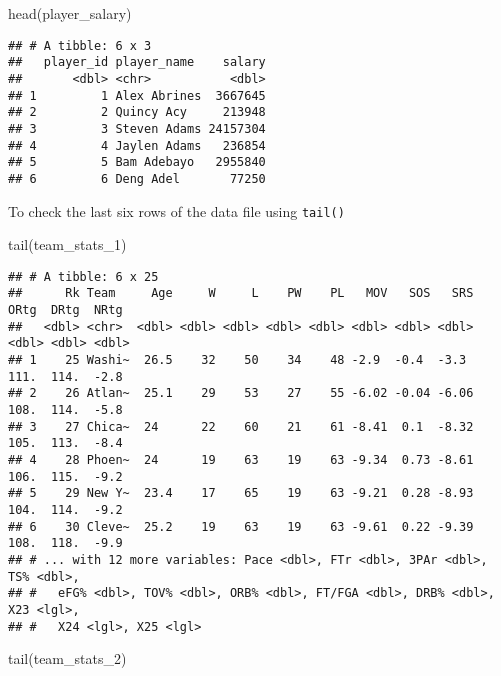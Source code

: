 \documentclass[
]{article}
\newenvironment{Shaded}{\begin{snugshade}}{\end{snugshade}}
\newcommand{\FunctionTok}[1]{\textcolor[rgb]{0.00,0.00,0.00}{#1}}
\newcommand{\NormalTok}[1]{#1}
\begin{document}
\begin{Shaded}
\begin{Highlighting}[]
\FunctionTok{head}\NormalTok{(player\_salary)}
\end{Highlighting}
\end{Shaded}

\begin{verbatim}
## # A tibble: 6 x 3
##   player_id player_name    salary
##       <dbl> <chr>           <dbl>
## 1         1 Alex Abrines  3667645
## 2         2 Quincy Acy     213948
## 3         3 Steven Adams 24157304
## 4         4 Jaylen Adams   236854
## 5         5 Bam Adebayo   2955840
## 6         6 Deng Adel       77250
\end{verbatim}

To check the last six rows of the data file using \texttt{tail()}

\begin{Shaded}
\begin{Highlighting}[]
\FunctionTok{tail}\NormalTok{(team\_stats\_1)}
\end{Highlighting}
\end{Shaded}

\begin{verbatim}
## # A tibble: 6 x 25
##      Rk Team     Age     W     L    PW    PL   MOV   SOS   SRS  ORtg  DRtg  NRtg
##   <dbl> <chr>  <dbl> <dbl> <dbl> <dbl> <dbl> <dbl> <dbl> <dbl> <dbl> <dbl> <dbl>
## 1    25 Washi~  26.5    32    50    34    48 -2.9  -0.4  -3.3   111.  114.  -2.8
## 2    26 Atlan~  25.1    29    53    27    55 -6.02 -0.04 -6.06  108.  114.  -5.8
## 3    27 Chica~  24      22    60    21    61 -8.41  0.1  -8.32  105.  113.  -8.4
## 4    28 Phoen~  24      19    63    19    63 -9.34  0.73 -8.61  106.  115.  -9.2
## 5    29 New Y~  23.4    17    65    19    63 -9.21  0.28 -8.93  104.  114.  -9.2
## 6    30 Cleve~  25.2    19    63    19    63 -9.61  0.22 -9.39  108.  118.  -9.9
## # ... with 12 more variables: Pace <dbl>, FTr <dbl>, 3PAr <dbl>, TS% <dbl>,
## #   eFG% <dbl>, TOV% <dbl>, ORB% <dbl>, FT/FGA <dbl>, DRB% <dbl>, X23 <lgl>,
## #   X24 <lgl>, X25 <lgl>
\end{verbatim}

\begin{Shaded}
\begin{Highlighting}[]
\FunctionTok{tail}\NormalTok{(team\_stats\_2)}
\end{Highlighting}
\end{Shaded}
\end{document}
